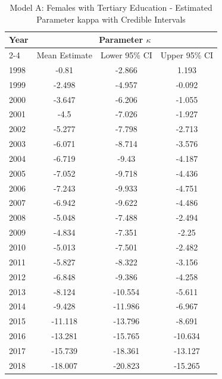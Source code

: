\begin{landscape}
\begin{table}[htbp]
\centering
\caption{Model A: Females with Tertiary Education - Estimated Parameter kappa  with Credible Intervals}
\label{tab:parameters_k4}
\begin{tabular}{@{}lccc@{}}
\toprule
Year & \multicolumn{3}{c}{Parameter \(\kappa\)} \\
\cmidrule(lr){2-4}
      & Mean Estimate & Lower 95\% CI & Upper 95\% CI \\
\midrule
1998 & -0.81 & -2.866 & 1.193 \\
1999 & -2.498 & -4.957 & -0.092 \\
2000 & -3.647 & -6.206 & -1.055 \\
2001 & -4.5 & -7.026 & -1.927 \\
2002 & -5.277 & -7.798 & -2.713 \\
2003 & -6.071 & -8.714 & -3.576 \\
2004 & -6.719 & -9.43 & -4.187 \\
2005 & -7.052 & -9.718 & -4.436 \\
2006 & -7.243 & -9.933 & -4.751 \\
2007 & -6.942 & -9.622 & -4.486 \\
2008 & -5.048 & -7.488 & -2.494 \\
2009 & -4.834 & -7.351 & -2.25 \\
2010 & -5.013 & -7.501 & -2.482 \\
2011 & -5.827 & -8.322 & -3.156 \\
2012 & -6.848 & -9.386 & -4.258 \\
2013 & -8.124 & -10.554 & -5.611 \\
2014 & -9.428 & -11.986 & -6.967 \\
2015 & -11.118 & -13.796 & -8.691 \\
2016 & -13.281 & -15.765 & -10.634 \\
2017 & -15.739 & -18.361 & -13.127 \\
2018 & -18.007 & -20.823 & -15.265 \\
\bottomrule
\end{tabular}
\end{table}
\end{landscape}